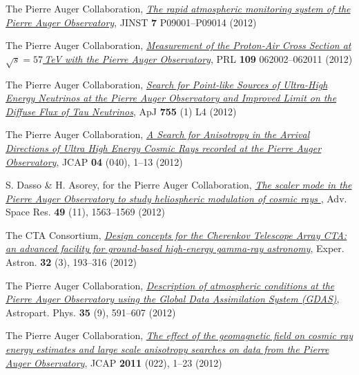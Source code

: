 \begin{etaremune}
\item {}The Pierre Auger Collaboration,
\href{http://dx.doi.org/10.1088/1748-0221/7/09/P09001}{\emph{The rapid
atmospheric monitoring system of the Pierre Auger Observatory}}, JINST
{\bf{7}} P09001--P09014 (2012)

\item {}The Pierre Auger Collaboration,
\href{http://dx.doi.org/10.1103/PhysRevLett.109.062002}{\emph{Measurement of
the Proton-Air Cross Section at $\sqrt{s}=57$\,TeV with the Pierre Auger
Observatory}}, PRL {\bf{109}} 062002--062011 (2012)

\item {}The Pierre Auger Collaboration,
\href{http://dx.doi.org/10.1088/2041-8205/755/1/L4}{\emph{Search for Point-like
Sources of Ultra-High Energy Neutrinos at the Pierre Auger Observatory and
Improved Limit on the Diffuse Flux of Tau Neutrinos}}, ApJ {\bf{755}} (1) L4
(2012)

\item {}The Pierre Auger Collaboration, 
\href{http://dx.doi.org/10.1088/1475-7516/2012/04/040}{\emph{A Search for
Anisotropy in the Arrival Directions of Ultra High Energy Cosmic Rays recorded
at the Pierre Auger Observatory}}, JCAP {\bf{04}} (040), 1--13 (2012)

\item {}S. Dasso \& H. Asorey, for the Pierre Auger Collaboration,
\href{http://dx.doi.org/10.1016/j.asr.2011.12.028}{\emph{ The scaler mode in
the Pierre Auger Observatory to study heliospheric modulation of cosmic rays
}}, Adv. Space Res. {\bf{49}} (11), 1563--1569 (2012)

\item {}The CTA Consortium,
\href{http://dx.doi.org/10.1007/s10686-011-9247-0}{\emph{Design concepts for
the Cherenkov Telescope Array CTA: an advanced facility for ground-based
high-energy gamma-ray astronomy}}, Exper. Astron. {\bf{32}} (3), 193--316
(2012)

\item {}The Pierre Auger Collaboration, 
\href{http://dx.doi.org/10.1016/j.astropartphys.2011.12.002}{\emph{Description
of atmospheric conditions at the Pierre Auger Observatory using the Global Data
Assimilation System (GDAS)}}, Astropart. Phys. {\bf{35}} (9), 591--607 (2012)

\item {}The Pierre Auger Collaboration, 
\href{http://dx.doi.org/10.1088/1475-7516/2011/11/022}{\emph{The effect of the
geomagnetic field on cosmic ray energy estimates and large scale anisotropy
searches on data from the Pierre Auger Observatory}}, JCAP {\bf{2011}} (022),
1--23 (2012)


\end{etaremune}
